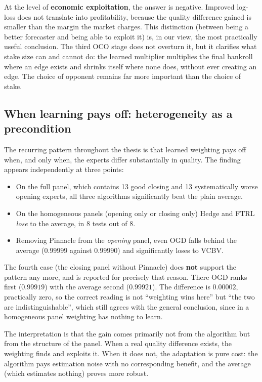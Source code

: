 \documentclass[12pt,a4paper,oneside]{report}
\renewcommand{\_}{\oldunderscore\allowbreak}
\theoremstyle{definition}
\theoremstyle{plain}
\theoremstyle{remark}
\begin{document}
At the level of \textbf{economic exploitation}, the answer is negative. Improved log-loss does
not translate into profitability, because the quality difference gained is smaller than the
margin the market charges. This distinction (between being a better forecaster and being able
to exploit it) is, in our view, the most practically useful conclusion. The third OCO stage
does not overturn it, but it clarifies what stake size can and cannot do: the learned
multiplier multiplies the final bankroll where an edge exists and shrinks itself where none
does, without ever creating an edge. The choice of opponent remains far more important than the
choice of stake.

\subsection{When learning pays off: heterogeneity as a precondition}
\label{sec:disc-hetero}

The recurring pattern throughout the thesis is that learned weighting pays off when, and only
when, the experts differ substantially in quality. The finding appears independently at three
points:

\begin{itemize}
  \item On the full panel, which contains 13 good closing and 13 systematically worse opening
        experts, all three algorithms significantly beat the plain average.
  \item On the homogeneous panels (opening only or closing only) Hedge and FTRL \emph{lose} to
        the average, in 8 tests out of 8.
  \item Removing Pinnacle from the \emph{opening} panel, even OGD falls behind the average
        ($0.99999$ against $0.99990$) and significantly loses to VC\_BV.
\end{itemize}

The fourth case (the closing panel without Pinnacle) does \textbf{not} support the pattern any
more, and is reported for precisely that reason. There OGD ranks first ($0.99919$) with the
average second ($0.99921$). The difference is $0.00002$, practically zero, so the correct
reading is not ``weighting wins here'' but ``the two are indistinguishable'', which still
agrees with the general conclusion, since in a homogeneous panel weighting has nothing to
learn.

The interpretation is that the gain comes primarily not from the algorithm but from the structure
of the panel. When a real quality difference exists, the weighting finds and exploits it. When it
does not, the adaptation is pure cost: the algorithm pays estimation noise with no corresponding
benefit, and the average (which estimates nothing) proves more robust.
\end{document}
